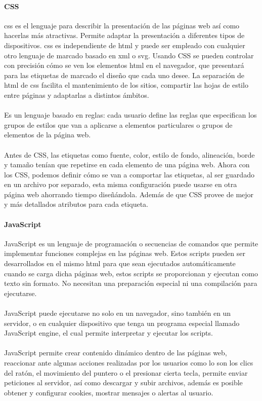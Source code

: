 \documentclass[12pt, a4paper, titlepage]{report}
\begin{document}
		   	\paragraph{CSS\\}
		   	
		   	\acrfull{css} es el lenguaje para describir la presentación de las páginas web así como hacerlas más atractivas. Permite adaptar la presentación a diferentes tipos de dispositivos. \acrshort{css} es independiente de \acrshort{html} y puede ser empleado con cualquier otro lenguaje de marcado basado en \acrshort{xml} o \acrshort{svg}. Usando CSS se pueden controlar con precisión cómo se ven los elementos \acrshort{html} en el navegador, que presentará para las etiquetas de marcado el diseño que cada uno desee. La separación de \acrshort{html} de \acrshort{css} facilita el mantenimiento de los sitios, compartir las hojas de estilo entre páginas y adaptarlas a distintos ámbitos. \cite{refcss}\\\\
		   	Es un lenguaje basado en reglas: cada usuario define las reglas que especifican los grupos de estilos que van a aplicarse a elementos particulares o grupos de elementos de la página web.\\\\
		   	Antes de CSS, las etiquetas como fuente, color, estilo de fondo, alineación, borde y tamaño tenían que repetirse en cada elemento de una página web. Ahora con los CSS, podemos definir cómo se van a comportar las etiquetas, al ser guardado en un archivo por separado, esta misma configuración puede usarse en otra página web ahorrando tiempo diseñándola. Además de que CSS provee de mejor y más detallados atributos para cada etiqueta.
		   	
		   	\paragraph {JavaScript \\}
		   	
		   	JavaScript es un lenguaje de programación o secuencias de comandos que permite implementar funciones complejas en las páginas web. Estos scripts pueden ser desarrollados en el mismo \acrshort{html} para que sean ejecutados automáticamente cuando se carga dicha páginas web, estos scripts se proporcionan y ejecutan como texto sin formato. No necesitan una preparación especial ni una compilación para ejecutarse. \cite{refjs}\\\\
		   	JavaScript puede ejecutarse no solo en un navegador, sino también en un servidor, o en cualquier dispositivo que tenga un programa especial llamado JavaScript engine, el cual permite interpretar y ejecutar los scripts.\\\\
		   	JavaScript permite crear contenido dinámico dentro de las páginas web, reaccionar ante algunas acciones realizadas por los usuarios como lo son los clics del ratón, el movimiento del puntero o el presionar cierta tecla, permite enviar peticiones al servidor, así como descargar y subir archivos, además es posible obtener y configurar cookies, mostrar mensajes o alertas al usuario.
		   	
\end{document}
